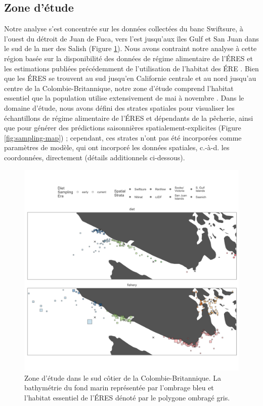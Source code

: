 \subsection{Zone d'étude}

Notre analyse s'est concentrée sur les données collectées du banc Swiftsure, à l'ouest du détroit de Juan de Fuca, vers l'est jusqu'aux îles Gulf et San Juan dans le sud de la mer des Salish (Figure \ref{fig:study-area}). Nous avons contraint notre analyse à cette région basée sur la disponibilité des données de régime alimentaire de l'ÉRES et les estimations publiées précédemment de l'utilisation de l'habitat des ÉRE \citep{thorntonSouthernResidentKiller2022}. Bien que les ÉRES se trouvent au sud jusqu'en Californie centrale et au nord jusqu'au centre de la Colombie-Britannique, notre zone d'étude comprend l'habitat essentiel que la population utilise extensivement de mai à novembre \citep{dfoIdentificationHabitatsSpecial2017}. Dans le domaine d'étude, nous avons défini des strates spatiales pour visualiser les échantillons de régime alimentaire de l'ÉRES et dépendants de la pêcherie, ainsi que pour générer des prédictions saisonnières spatialement-explicites (Figure \ref{fig:sampling-map}) ; cependant, ces strates n'ont pas été incorporées comme paramètres de modèle, qui ont incorporé les données spatiales, c.-à-d. les coordonnées, directement (détails additionnels ci-dessous).

\begin{figure}[H]
    \centering
    \includegraphics[width=5in]{figs/study_area.png}
    \caption{Zone d'étude dans le sud côtier de la Colombie-Britannique. La bathymétrie du fond marin représentée par l'ombrage bleu et l'habitat essentiel de l'ÉRES dénoté par le polygone ombragé gris.}
    \label{fig:study-area}
\end{figure}

